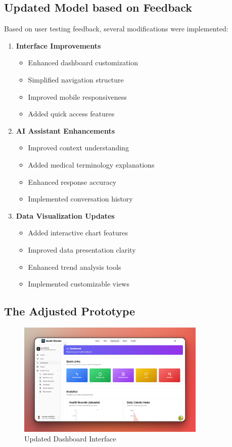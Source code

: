 \subsection{Updated Model based on Feedback}

Based on user testing feedback, several modifications were implemented:

\begin{enumerate}
    \item \textbf{Interface Improvements}
    \begin{itemize}
        \item Enhanced dashboard customization
        \item Simplified navigation structure
        \item Improved mobile responsiveness
        \item Added quick access features
    \end{itemize}

    \item \textbf{AI Assistant Enhancements}
    \begin{itemize}
        \item Improved context understanding
        \item Added medical terminology explanations
        \item Enhanced response accuracy
        \item Implemented conversation history
    \end{itemize}

    \item \textbf{Data Visualization Updates}
    \begin{itemize}
        \item Added interactive chart features
        \item Improved data presentation clarity
        \item Enhanced trend analysis tools
        \item Implemented customizable views
    \end{itemize}
\end{enumerate}

\subsection{The Adjusted Prototype}
\begin{figure}[H]
    \centering
    \includegraphics[width=0.8\textwidth]{public/landing/hm-dashboard.png}
    \caption{Updated Dashboard Interface}
\end{figure}


